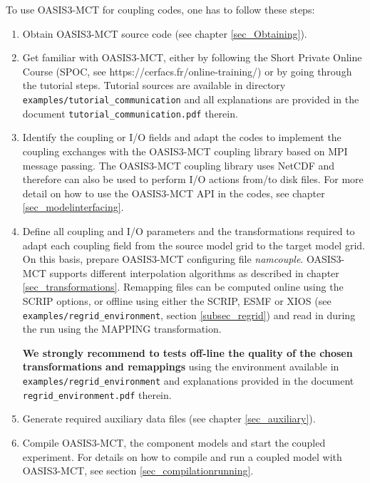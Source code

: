 To use OASIS3-MCT for coupling codes, one has to follow these steps:
\begin{enumerate}
\item Obtain OASIS3-MCT source code (see chapter \ref{sec_Obtaining}).
\item Get familiar with OASIS3-MCT, either by following the Short Private Online Course (SPOC, see  https://cerfacs.fr/online-training/) or by going through the tutorial steps. Tutorial sources are available in directory {\tt
  examples/tutorial\_communication} and all explanations are provided in the document
{\tt tutorial\_communication.pdf} therein.

\item Identify the coupling or I/O fields and adapt the codes to
  implement the coupling exchanges with the OASIS3-MCT coupling library based on MPI message passing.
  The OASIS3-MCT coupling library uses NetCDF and therefore can also be used to perform I/O actions
  from/to disk files.  For more detail on how to use the 
  OASIS3-MCT API in the codes, see chapter \ref{sec_modelinterfacing}.

\item Define all coupling and I/O parameters and the transformations
  required to adapt each coupling field from the source model grid to
  the target model grid. On this basis, prepare OASIS3-MCT configuring file 
  {\it namcouple}.
  OASIS3-MCT supports different interpolation algorithms as described in
  chapter \ref{sec_transformations}.  Remapping files can be computed
  online using the SCRIP options, or offline using either the SCRIP, ESMF or XIOS (see  {\tt
  examples/regrid\_environment}, section \ref{subsec_regrid}) and read in during the run using the MAPPING
  transformation.

{\bf We strongly recommend to tests off-line the quality of the chosen transformations and remappings} using the environment available in {\tt
  examples/regrid\_environment} and explanations provided in the document {\tt regrid\_environment.pdf} therein. 

\item Generate required auxiliary data files (see chapter
  \ref{sec_auxiliary}).
\item Compile OASIS3-MCT, the component models and start the coupled
  experiment. For details on how to compile and run a coupled model
  with OASIS3-MCT, see section \ref{sec_compilationrunning}. 

\end{enumerate}

